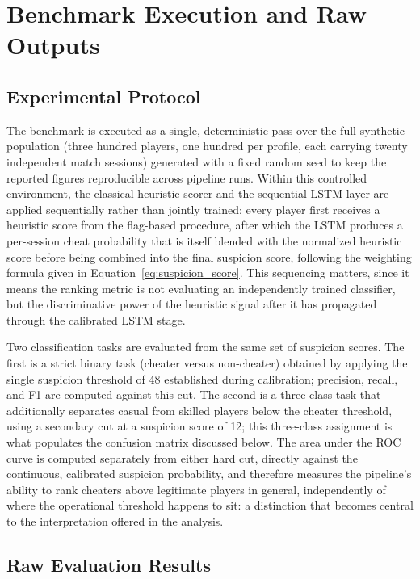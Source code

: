 \section{Benchmark Execution and Raw Outputs}
\label{sec:three:three}

\subsection{Experimental Protocol}
\label{sec:three:three:one}

The benchmark is executed as a single, deterministic pass over the full synthetic population (three hundred players, one hundred per profile, each carrying twenty independent match sessions) generated with a fixed random seed to keep the reported figures reproducible across pipeline runs. Within this controlled environment, the classical heuristic scorer and the sequential LSTM layer are applied sequentially rather than jointly trained: every player first receives a heuristic score from the flag-based procedure, after which the LSTM produces a per-session cheat probability that is itself blended with the normalized heuristic score before being combined into the final suspicion score, following the weighting formula given in Equation~\eqref{eq:suspicion_score}. This sequencing matters, since it means the ranking metric is not evaluating an independently trained classifier, but the discriminative power of the heuristic signal after it has propagated through the calibrated LSTM stage.

Two classification tasks are evaluated from the same set of suspicion scores. The first is a strict binary task (cheater versus non-cheater) obtained by applying the single suspicion threshold of 48 established during calibration; precision, recall, and F1 are computed against this cut. The second is a three-class task that additionally separates casual from skilled players below the cheater threshold, using a secondary cut at a suspicion score of 12; this three-class assignment is what populates the confusion matrix discussed below. The area under the ROC curve is computed separately from either hard cut, directly against the continuous, calibrated suspicion probability, and therefore measures the pipeline's ability to rank cheaters above legitimate players in general, independently of where the operational threshold happens to sit: a distinction that becomes central to the interpretation offered in the analysis.

\subsection{Raw Evaluation Results}
\label{sec:three:three:two}


